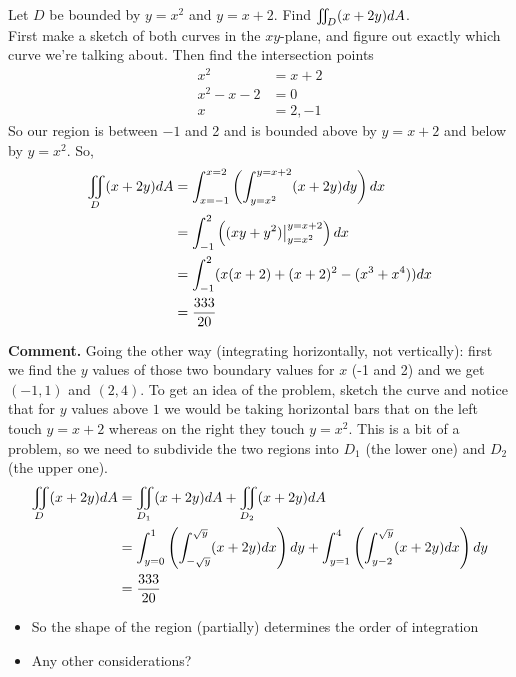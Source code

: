 \documentclass[english, 11pt]{article}
\begin{document}
\begin{exmp}
  Let $D$ be bounded by $y = x^2$ and $y = x + 2$. Find $\iint\displaylimits_D (x + 2y) dA$. \\

  First make a sketch of both curves in the $xy$-plane, and figure out exactly which curve we're talking about. Then find the intersection points
  \begin{align*}
    x^2 & = x + 2 \\
    x^2 - x - 2 & = 0 \\
    x & = 2, -1
  \end{align*}
  So our region is between $-1$ and 2 and is bounded above by $y = x + 2$ and below by $y = x^2$. So,
  \begin{align*}
    \iint\displaylimits_D (x + 2y) dA & = \int_{x = -1}^{x=2} \left(  \int_{y = x^2}^{y = x + 2} (x+2y) dy \right) dx \\
    & = \int_{-1}^2 \left( (xy + y^2) \big|_{y = x^2}^{y = x + 2} \right) dx \\
    & = \int_{-1}^2 (x(x+2) +(x+2)^2 - (x^3 + x^4)) dx \\
    & = \frac{333}{20}
  \end{align*}

  \textbf{Comment.} Going the other way (integrating horizontally, not vertically): first we find the $y$ values of those two boundary values for $x$ (-1 and 2) and we get $(-1,1)$ and $(2,4)$. To get an idea of the problem, sketch the curve and notice that for $y$ values above $1$ we would be taking horizontal bars that on the left touch $y = x + 2$ whereas on the right they touch $y = x^2$. This is a bit of a problem, so we need to subdivide the two regions into $D_1$ (the lower one) and $D_2$ (the upper one).
  \begin{align*}
    \iint\displaylimits_D (x+2y) dA & = \iint\displaylimits_{D_1} (x+2y) dA + \iint\displaylimits_{D_2} (x + 2y) dA \\
    & = \int_{y = 0}^{1} \left( \int_{-\sqrt{y}}^{\sqrt{y}} (x + 2y) dx \right) dy + \int_{y = 1}^{4} \left( \int_{y - 2}^{\sqrt{y}} (x + 2y) dx \right) dy \\
    & = \frac{333}{20}
  \end{align*}
  \begin{itemize}
    \item So the shape of the region (partially) determines the order of integration
    \item Any other considerations?
  \end{itemize}
\end{exmp}
\end{document}
